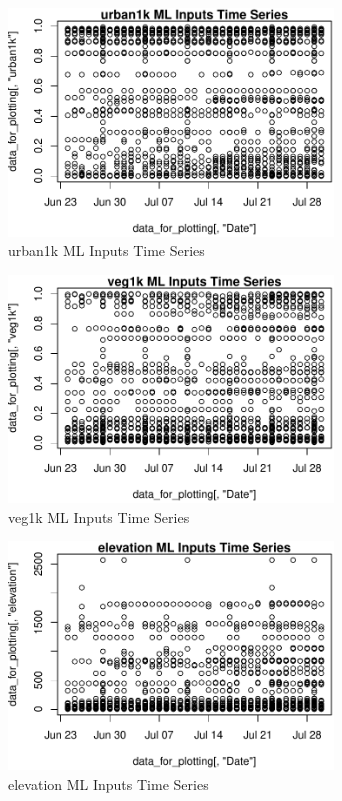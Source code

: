 \begin{figure} 
\centering  
\includegraphics[width=0.77\textwidth]{Code_Outputs/ML_input_report_AllforCaret_cleaned_StepPractice_part_practice_urban1kTS.pdf} 
\caption{\label{fig:ML_input_report_AllforCaret_cleaned_StepPractice_part_practiceurban1kTS}urban1k ML Inputs Time Series} 
\end{figure} 
 

\begin{figure} 
\centering  
\includegraphics[width=0.77\textwidth]{Code_Outputs/ML_input_report_AllforCaret_cleaned_StepPractice_part_practice_veg1kTS.pdf} 
\caption{\label{fig:ML_input_report_AllforCaret_cleaned_StepPractice_part_practiceveg1kTS}veg1k ML Inputs Time Series} 
\end{figure} 
 

\begin{figure} 
\centering  
\includegraphics[width=0.77\textwidth]{Code_Outputs/ML_input_report_AllforCaret_cleaned_StepPractice_part_practice_elevationTS.pdf} 
\caption{\label{fig:ML_input_report_AllforCaret_cleaned_StepPractice_part_practiceelevationTS}elevation ML Inputs Time Series} 
\end{figure} 
 

